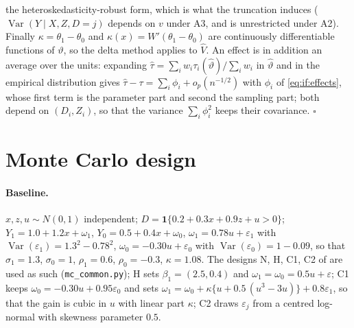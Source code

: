 \documentclass[11pt,a4paper]{article}
\theoremstyle{plain}
\theoremstyle{definition}
\theoremstyle{remark}
\newcommand{\Var}{\operatorname{Var}}
\newcommand{\1}{\mathbf{1}}
\newcommand{\cmd}[1]{\texttt{#1}}
\newcommand{\kX}{\kappa(x)}
\begin{document}
the heteroskedasticity-robust form, which is what the truncation induces
($\Var(Y\mid X,Z,D=j)$ depends on $v$ under A3, and is unrestricted
under A2). Finally $\kappa=\theta_1-\theta_0$ and $\kX=W'(\theta_1-\theta_0)$
are continuously differentiable functions of $\vartheta$, so the delta
method applies to $\hat V$. An effect is in addition an average over the
units: expanding $\hat\tau=\sum_iw_i\tau_i(\hat\vartheta)/\sum_iw_i$ in
$\hat\vartheta$ and in the empirical distribution gives
$\hat\tau-\tau=\sum_i\phi_i+o_p(n^{-1/2})$ with $\phi_i$ of
\eqref{eq:if:effects}, whose first term is the parameter part and second
the sampling part; both depend on $(D_i,Z_i)$, so that the variance
$\sum_i\phi_i^2$ keeps their covariance. \hfill$\square$

\section{Monte Carlo design}\label{app:dgp}

\paragraph{Baseline.} $x,z,u\sim N(0,1)$ independent;
$D=\1\{0.2+0.3x+0.9z+u>0\}$; $Y_1=1.0+1.2x+\omega_1$,
$Y_0=0.5+0.4x+\omega_0$, $\omega_1=0.78u+\varepsilon_1$ with
$\Var(\varepsilon_1)=1.3^2-0.78^2$, $\omega_0=-0.30u+\varepsilon_0$ with
$\Var(\varepsilon_0)=1-0.09$, so that $\sigma_1=1.3$, $\sigma_0=1$,
$\rho_1=0.6$, $\rho_0=-0.3$, $\kappa=1.08$. The designs N, H, C1, C2 of
\citet[Appendix B]{araar2026sog} are used as such (\cmd{mc\_common.py});
H sets $\beta_1=(2.5,0.4)$ and $\omega_1=\omega_0=0.5u+\varepsilon$; C1
keeps $\omega_0=-0.30u+0.95\varepsilon_0$ and sets
$\omega_1=\omega_0+\kappa\{u+0.5\,(u^3-3u)\}+0.8\varepsilon_1$, so that the
gain is cubic in $u$ with linear part $\kappa$; C2 draws $\varepsilon_j$
from a centred log-normal with skewness parameter $0.5$.
\end{document}
